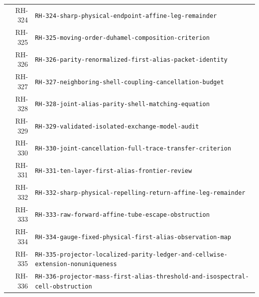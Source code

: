 \begin{longtable}{r >{\raggedright\arraybackslash}p{}}
RH-324 & \texttt{RH-\allowbreak{}324-\allowbreak{}sharp-\allowbreak{}physical-\allowbreak{}endpoint-\allowbreak{}affine-\allowbreak{}leg-\allowbreak{}remainder}\\
RH-325 & \texttt{RH-\allowbreak{}325-\allowbreak{}moving-\allowbreak{}order-\allowbreak{}duhamel-\allowbreak{}composition-\allowbreak{}criterion}\\
RH-326 & \texttt{RH-\allowbreak{}326-\allowbreak{}parity-\allowbreak{}renormalized-\allowbreak{}first-\allowbreak{}alias-\allowbreak{}packet-\allowbreak{}identity}\\
RH-327 & \texttt{RH-\allowbreak{}327-\allowbreak{}neighboring-\allowbreak{}shell-\allowbreak{}coupling-\allowbreak{}cancellation-\allowbreak{}budget}\\
RH-328 & \texttt{RH-\allowbreak{}328-\allowbreak{}joint-\allowbreak{}alias-\allowbreak{}parity-\allowbreak{}shell-\allowbreak{}matching-\allowbreak{}equation}\\
RH-329 & \texttt{RH-\allowbreak{}329-\allowbreak{}validated-\allowbreak{}isolated-\allowbreak{}exchange-\allowbreak{}model-\allowbreak{}audit}\\
RH-330 & \texttt{RH-\allowbreak{}330-\allowbreak{}joint-\allowbreak{}cancellation-\allowbreak{}full-\allowbreak{}trace-\allowbreak{}transfer-\allowbreak{}criterion}\\
RH-331 & \texttt{RH-\allowbreak{}331-\allowbreak{}ten-\allowbreak{}layer-\allowbreak{}first-\allowbreak{}alias-\allowbreak{}frontier-\allowbreak{}review}\\
RH-332 & \texttt{RH-\allowbreak{}332-\allowbreak{}sharp-\allowbreak{}physical-\allowbreak{}repelling-\allowbreak{}return-\allowbreak{}affine-\allowbreak{}leg-\allowbreak{}remainder}\\
RH-333 & \texttt{RH-\allowbreak{}333-\allowbreak{}raw-\allowbreak{}forward-\allowbreak{}affine-\allowbreak{}tube-\allowbreak{}escape-\allowbreak{}obstruction}\\
RH-334 & \texttt{RH-\allowbreak{}334-\allowbreak{}gauge-\allowbreak{}fixed-\allowbreak{}physical-\allowbreak{}first-\allowbreak{}alias-\allowbreak{}observation-\allowbreak{}map}\\
RH-335 & \texttt{RH-\allowbreak{}335-\allowbreak{}projector-\allowbreak{}localized-\allowbreak{}parity-\allowbreak{}ledger-\allowbreak{}and-\allowbreak{}cellwise-\allowbreak{}extension-\allowbreak{}nonuniqueness}\\
RH-336 & \texttt{RH-\allowbreak{}336-\allowbreak{}projector-\allowbreak{}mass-\allowbreak{}first-\allowbreak{}alias-\allowbreak{}threshold-\allowbreak{}and-\allowbreak{}isospectral-\allowbreak{}cell-\allowbreak{}obstruction}\\

\end{longtable}
